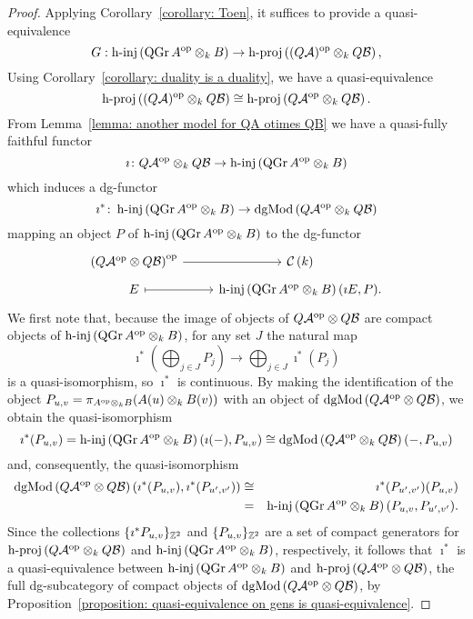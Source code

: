 \begin{proof}
  Applying Corollary~\ref{corollary: Toen}, it suffices to provide a quasi-equivalence
  \begin{displaymath}
    G : \operatorname{h-inj}\left(\operatorname{QGr}A^{\operatorname{op}} \otimes_k B\right) \to \operatorname{h-proj}\left( (Q \mathcal A)^{\operatorname{op}} \otimes_k Q \mathcal B\right),
  \end{displaymath}
  Using Corollary~\ref{corollary: duality is a duality}, we have a quasi-equivalence
  \begin{displaymath}
    \operatorname{h-proj}\left( (Q \mathcal A)^{\operatorname{op}} \otimes_k Q \mathcal B\right) \cong \operatorname{h-proj}\left( Q \mathcal A^{\operatorname{op}} \otimes_k Q \mathcal B\right). 
  \end{displaymath}
  From Lemma~\ref{lemma: another model for QA otimes QB} we have a quasi-fully faithful functor 
  \begin{displaymath}
    \imath \colon Q \mathcal A^{\operatorname{op}} \otimes_k Q \mathcal B \to \operatorname{h-inj}\left(\operatorname{QGr}A^{\operatorname{op}} \otimes_k B\right)
  \end{displaymath}
  which induces a dg-functor
  \begin{displaymath}
    \imath^\ast \colon \operatorname{h-inj}\left(\operatorname{QGr}A^{\operatorname{op}} \otimes_k B\right) \to \operatorname{dgMod}\left(Q \mathcal A^{\operatorname{op}} \otimes_k Q \mathcal B\right)
  \end{displaymath}
  mapping an object \(P\) of \(\operatorname{h-inj}\left(\operatorname{QGr}A^{\operatorname{op}} \otimes_k B\right)\) to the dg-functor
  \[\begin{tikzcd}[row sep=tiny]
  \left(Q\A^\opp \otimes Q\B\right)^\opp \arrow{r} & \CH{k}\\
  E \arrow[mapsto]{r} & \hinj{\QGr{A^\opp \otimes_k B}}(\imath E, P).
  \end{tikzcd}\]
  We first note that, because the image of objects of \(Q\mathcal{A}^{\operatorname{op}} \otimes Q\mathcal{B}\) are compact objects of \(\operatorname{h-inj}\left(\operatorname{QGr}A^{\operatorname{op}} \otimes_k B\right)\), for any set \(J\) the natural map
  \[\imath^\ast\left(\bigoplus_{j \in J} P_j\right)\to \bigoplus_{j \in J} \imath^\ast(P_j)\]
  is a quasi-isomorphism, so \(\imath^\ast\) is continuous.
  By making the identification of the object \({P_{u,v} = \pi_{A^{\operatorname{op}} \otimes_k B}(A(u) \otimes_k B(v))}\) with an object of \(\operatorname{dgMod}\left(Q\mathcal{A}^{\operatorname{op}} \otimes Q\mathcal{B}\right)\), we obtain the quasi-isomorphism
  \[\imath^\ast(P_{u,v}) = \operatorname{h-inj}\left(\operatorname{QGr}A^{\operatorname{op}} \otimes_k B\right)(\imath(-), P_{u,v}) \cong \operatorname{dgMod}\left(Q\mathcal{A}^{\operatorname{op}} \otimes_k Q\mathcal{B}\right)(-, P_{u,v})\]
  and, consequently, the quasi-isomorphism
  \begin{eqnarray*}
    \operatorname{dgMod}\left(Q\mathcal{A}^{\operatorname{op}} \otimes Q\mathcal{B}\right)(\imath^\ast(P_{u,v}), \imath^\ast(P_{u^\prime, v^\prime}))
    &\cong& \imath^\ast(P_{u^\prime, v^\prime})(P_{u,v}) \\
    &=& \operatorname{h-inj}\left(\operatorname{QGr}A^{\operatorname{op}} \otimes_k B\right)(P_{u,v}, P_{u^\prime, v^\prime}).
  \end{eqnarray*}
  Since the collections \(\{\imath^\ast P_{u,v}\}_{\mathbb{Z}^2}\) and \(\{P_{u,v}\}_{\mathbb{Z}^2}\) are a set of compact generators for \(\operatorname{h-proj}\left(Q\mathcal{A}^{\operatorname{op}} \otimes_k Q\mathcal{B}\right)\) and \(\operatorname{h-inj}\left(\operatorname{QGr}A^{\operatorname{op}} \otimes_k B\right)\), respectively, it follows that \(\imath^\ast\) is a quasi-equivalence between \(\operatorname{h-inj}\left(\operatorname{QGr}A^{\operatorname{op}} \otimes_k B\right)\) and \(\operatorname{h-proj}\left(Q\mathcal{A}^{\operatorname{op}} \otimes Q\mathcal{B}\right)\), the full dg-subcategory of compact objects of \(\operatorname{dgMod}\left(Q\mathcal{A}^{\operatorname{op}} \otimes Q\mathcal{B}\right)\), by Proposition~\ref{proposition: quasi-equivalence on gens is quasi-equivalence}.


\end{proof}
